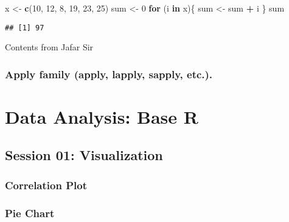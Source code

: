 \documentclass[
]{book}
\newenvironment{Shaded}{\begin{snugshade}}{\end{snugshade}}
\newcommand{\ControlFlowTok}[1]{\textcolor[rgb]{0.13,0.29,0.53}{\textbf{#1}}}
\newcommand{\DataTypeTok}[1]{\textcolor[rgb]{0.13,0.29,0.53}{#1}}
\newcommand{\DecValTok}[1]{\textcolor[rgb]{0.00,0.00,0.81}{#1}}
\newcommand{\KeywordTok}[1]{\textcolor[rgb]{0.13,0.29,0.53}{\textbf{#1}}}
\newcommand{\NormalTok}[1]{#1}
\newcommand{\OperatorTok}[1]{\textcolor[rgb]{0.81,0.36,0.00}{\textbf{#1}}}
\newcommand{\OtherTok}[1]{\textcolor[rgb]{0.56,0.35,0.01}{#1}}
\newcommand{\StringTok}[1]{\textcolor[rgb]{0.31,0.60,0.02}{#1}}
\begin{document}
\begin{Shaded}
\begin{Highlighting}[]
\NormalTok{x <-}\StringTok{ }\KeywordTok{c}\NormalTok{(}\DecValTok{10}\NormalTok{, }\DecValTok{12}\NormalTok{, }\DecValTok{8}\NormalTok{, }\DecValTok{19}\NormalTok{, }\DecValTok{23}\NormalTok{, }\DecValTok{25}\NormalTok{)}
\NormalTok{sum <-}\StringTok{ }\DecValTok{0}
\ControlFlowTok{for}\NormalTok{ (i }\ControlFlowTok{in}\NormalTok{ x)\{}
\NormalTok{  sum <-}\StringTok{ }\NormalTok{sum }\OperatorTok{+}\StringTok{ }\NormalTok{i}
\NormalTok{\}}
\NormalTok{sum}
\end{Highlighting}
\end{Shaded}

\begin{verbatim}
## [1] 97
\end{verbatim}

{Contents from Jafar Sir}

\hypertarget{apply-family-apply-lapply-sapply-etc..}{%
\subsection{Apply family (apply, lapply, sapply, etc.).}\label{apply-family-apply-lapply-sapply-etc..}}

\hypertarget{rbase}{%
\chapter{Data Analysis: Base R}\label{rbase}}

\hypertarget{session-01-visualization}{%
\section{Session 01: Visualization}\label{session-01-visualization}}

\hypertarget{correlation-plot}{%
\subsection{Correlation Plot}\label{correlation-plot}}

\hypertarget{pie-chart}{%
\subsection{Pie Chart}\label{pie-chart}}

\begin{Shaded}
\end{Shaded}
\end{document}
